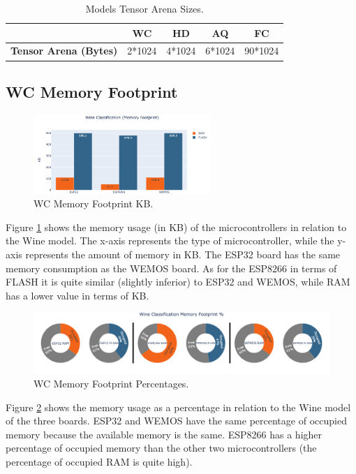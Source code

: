 \documentclass{article}
\begin{document}
\begin{table}[H]
    \caption{Models Tensor Arena Sizes.}    
    \centering
    \begin{tabular}{ |c|c|c|c|c| } 
        \hline 
        & {\bf WC} & {\bf HD} & {\bf AQ} & {\bf FC} \\
        \hline 
        {\bf Tensor Arena (Bytes)} & 2*1024 & 4*1024 & 6*1024 & 90*1024 \\ 
        \hline
    \end{tabular}
    \label{tab:6}
\end{table}

\subsection{WC Memory Footprint}

\begin{figure}[H]
    \centering
    \includegraphics[width=0.6\textwidth]{WC-Mem-KB.png}
    \caption{WC Memory Footprint KB.}
    \label{fig:10}
\end{figure}

Figure \ref{fig:10} shows the memory usage (in KB) of the microcontrollers in relation to the Wine model. The x-axis represents the type of microcontroller, while the y-axis represents the amount of memory in KB. The ESP32 board has the same memory consumption as the WEMOS board. As for the ESP8266 in terms of FLASH it is quite similar (slightly inferior) to ESP32 and WEMOS, while RAM has a lower value in terms of KB.

\begin{figure}[H]
    \centering
    \includegraphics[width=1.0\textwidth]{WC-Mem-perc.png}
    \caption{WC Memory Footprint Percentages.}
    \label{fig:11}
\end{figure}

Figure \ref{fig:11} shows the memory usage as a percentage in relation to the Wine model of the three boards. ESP32 and WEMOS have the same percentage of occupied memory because the available memory is the same. ESP8266 has a higher percentage of occupied memory than the other two microcontrollers (the percentage of occupied RAM is quite high).
\end{document}
